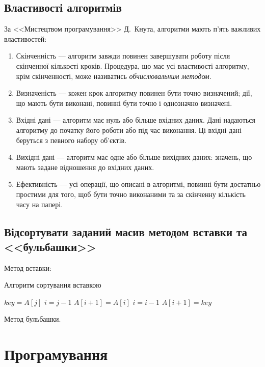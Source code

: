 \documentclass[a4paper,oneside,DIV=9,fontsize=12pt]{scrartcl}
\begin{document}
		\subsection{Властивості алгоритмів}
			За <<Мистецтвом програмування>> Д.~Кнута, алгоритми мають п'ять важливих властивостей:
			\begin{enumerate}
				\item Скінченність --- алгоритм завжди повинен завершувати роботу після скінченної кількості кроків. Процедура, що має усі властивості алгоритму, крім скінченності, може називатись \emph{обчислювальним методом}.
				\item Визначеність --- кожен крок алгоритму повинен бути точно визначений; дії, що мають бути виконані, повинні бути точно і однозначно визначені.
				\item Вхідні дані --- алгоритм має нуль або більше вхідних даних. Дані надаються алгоритму до початку його роботи або під час виконання. Ці вхідні дані беруться з певного набору об'єктів.
				\item Вихідні дані --- алгоритм має одне або більше вихідних даних: значень, що мають задане відношення до вхідних даних.
				\item Ефективність --- усі операції, що описані в алгоритмі, повинні бути достатньо простими для того, щоб бути точно виконаними та за скінченну кількість часу на папері.
			\end{enumerate}
			
		\subsection{Відсортувати заданий масив методом вставки та <<бульбашки>>}
			Метод вставки:
			
			\begin{algorithm}
				\caption{Алгоритм сортування вставкою}
				
				\begin{algorithmic}[1]
						\State $key = A[j]$
						\State $i = j - 1$
							\State $A[i+1] = A[i]$
							\State $i = i - 1$
						\EndWhile
						\State $A[i+1] = key$
					\EndFor
				\end{algorithmic}
				
			\end{algorithm}
			
			Метод бульбашки.
	\section{Програмування}
\end{document}
